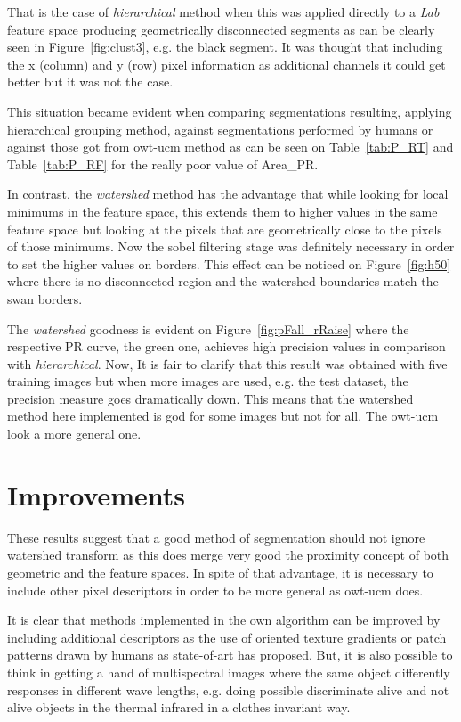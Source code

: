 \documentclass[10pt,twocolumn,letterpaper]{article}
\begin{document}
That is the case of \textit{hierarchical} method when this was applied directly to a \textit{Lab} feature space producing geometrically disconnected segments as can be clearly seen in Figure~\ref{fig:clust3}, e.g. the black segment. It was thought that including the x (column) and y (row) pixel information as additional channels it could get better but it was not the case.

This situation became evident when comparing segmentations resulting, applying hierarchical grouping method, against segmentations performed by humans or against those got from owt-ucm method as can be seen on Table~\ref{tab:P_RT} and Table~\ref{tab:P_RF} for the really poor value of Area\_PR.

In contrast, the \textit{watershed} method has the advantage that while looking for local minimums in the feature space, this extends them to higher values in the same feature space  but looking at the pixels that are geometrically close to the pixels of those minimums. Now the sobel filtering stage was definitely necessary in order to set the higher values on borders. This effect can be noticed on Figure~\ref{fig:h50} where there is no disconnected region and the watershed boundaries match the swan borders.

The \textit{watershed} goodness is evident on Figure~\ref{fig:pFall_rRaise} where the respective PR curve, the green one, achieves high precision values in comparison with \textit{hierarchical}. Now, It is fair to clarify that this result was obtained with five training images but when more images are used, e.g. the test dataset, the precision measure goes dramatically down. This means that the watershed method here implemented is god for some images but not for all. The owt-ucm look a more general one.

\section{Improvements}
These results suggest that a good method of segmentation should not ignore watershed transform as this does merge very good the proximity concept of both geometric  and the feature spaces. In spite of that advantage, it is necessary to include other pixel descriptors in order to be more general as owt-ucm does.

It is clear that methods implemented in the own algorithm can be improved by including additional descriptors as the use of oriented texture gradients or patch patterns drawn by humans as state-of-art has proposed. But, it is also possible to think in getting a hand of multispectral images where the same object differently responses in different wave lengths, e.g. doing possible discriminate alive and not alive objects in the thermal infrared in a clothes invariant way.


{\small


}
\end{document}

